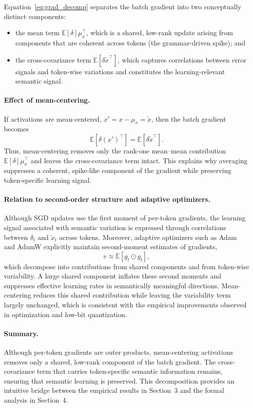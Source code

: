 \noindent
Equation~\eqref{eq:grad_decomp} separates the batch gradient into two conceptually
distinct components:
\begin{itemize}
  \item the mean term $\mathbb{E}[\delta]\mu_x^\top$, which is a shared, low-rank
  update arising from components that are coherent across tokens (the
  grammar-driven spike); and
  \item the cross-covariance term $\mathbb{E}[\delta \tilde{x}^\top]$, which
  captures correlations between error signals and token-wise variations and
  constitutes the learning-relevant semantic signal.
\end{itemize}

\paragraph{Effect of mean-centering.}
If activations are mean-centered, $x' = x - \mu_x = \tilde{x}$, then the batch
gradient becomes
\[
\mathbb{E}[\delta (x')^\top] = \mathbb{E}[\delta \tilde{x}^\top].
\]
Thus, mean-centering removes only the rank-one mean--mean contribution
$\mathbb{E}[\delta]\mu_x^\top$ and leaves the cross-covariance term intact.
This explains why averaging suppresses a coherent, spike-like component of the
gradient while preserving token-specific learning signal.

\paragraph{Relation to second-order structure and adaptive optimizers.}
Although SGD updates use the first moment of per-token gradients, the learning
signal associated with semantic variation is expressed through correlations
between $\delta_t$ and $\tilde{x}_t$ across tokens.
Moreover, adaptive optimizers such as Adam and AdamW explicitly maintain
second-moment estimates of gradients,
\[
v \approx \mathbb{E}[g_t \odot g_t],
\]
which decompose into contributions from shared components and from token-wise
variability.
A large shared component inflates these second moments and suppresses effective
learning rates in semantically meaningful directions.
Mean-centering reduces this shared contribution while leaving the variability
term largely unchanged, which is consistent with the empirical improvements
observed in optimization and low-bit quantization.

\paragraph{Summary.}
Although per-token gradients are outer products, mean-centering activations
removes only a shared, low-rank component of the batch gradient.
The cross-covariance term that carries token-specific semantic information
remains, ensuring that semantic learning is preserved.
This decomposition provides an intuitive bridge between the empirical results in
Section~3 and the formal analysis in Section~4.